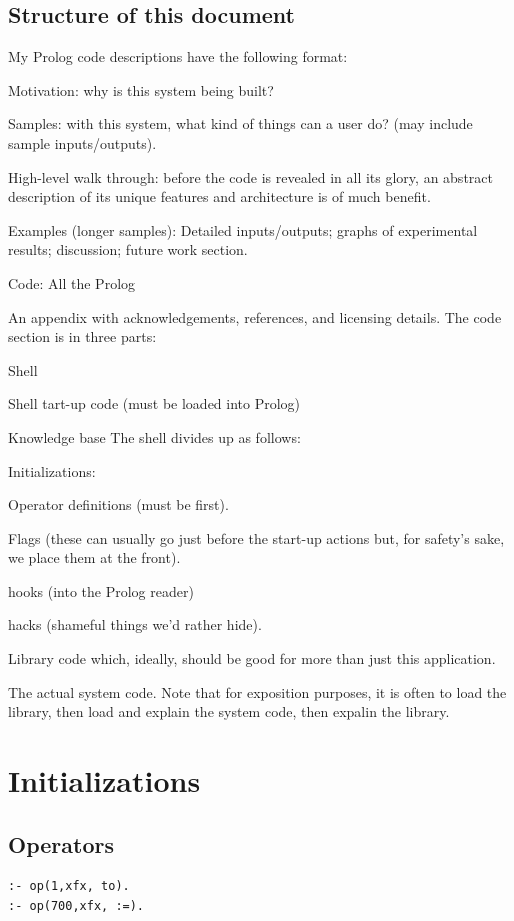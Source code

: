 \documentclass[twocolumn,global]{svjour}
\begin{document}
\subsection{ Structure of this document
}
 My Prolog code descriptions have the following format:
\be
\item Motivation: why is this system being built?
\item Samples: with this system, what kind of things can a user do?
(may include
sample inputs/outputs).
\item High-level walk through: before the code is revealed in all its glory,
    an abstract description of its unique features and architecture is
    of much benefit.
\item Examples (longer samples): Detailed inputs/outputs; graphs of
experimental results; discussion; future work section.
\item Code: All the Prolog
\item
An appendix with acknowledgements, references, and licensing details.
\ee
The code section is in three parts:
\be
\item
Shell
\item
Shell tart-up code (must be loaded into Prolog)
\item Knowledge base
\ee
The shell divides up as follows:
\be
\item Initializations:
\bi
\item
Operator definitions (must be first).
\item
Flags (these can usually go just before the start-up
actions but, for safety's sake, we place them at the
front).
\item
hooks (into the Prolog reader)
\item
hacks (shameful things we'd rather hide).
\ei
\item
Library code which, ideally,
should be good for more than just this application.
\item
The actual system code.
\ee
Note that for exposition purposes, it is often  to load the library, then load
and explain the system code, then expalin the library.
\section{ Initializations
}
\subsection{ Operators }\begin{Verbatim}
:- op(1,xfx, to).
:- op(700,xfx, :=).
\end{Verbatim}
\end{document}
